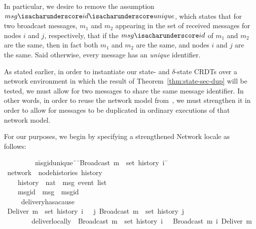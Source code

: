 In particular, we desire to remove the assumption
$msg{\isacharunderscore}id{\isacharunderscore}unique$, which states that for two
broadcast messages, $m_1$ and $m_2$ appearing in the set of received messages
for nodes $i$ and $j$, respectively, that if the $msg{\isacharunderscore}id$ of
$m_1$ and $m_2$ are the same, then in fact both $m_1$ and $m_2$ are the same,
and nodes $i$ and $j$ are the same. Said otherwise, every message has an
\emph{unique} identifier.

As stated earlier, in order to instantiate our state- and $\delta$-state CRDTs
over a network environment in which the result of
Theorem~\ref{thm:state-sec-dup} will be tested, we must allow for two messages
to share the same message identifier. In other words, in order to reuse the
network model from~\citep{gomes17}, we must strengthen it in order to allow for
messages to be duplicated in ordinary executions of that network model.

For our purposes, we begin by specifying a strengthened Network locale as
follows:
\begin{isabelle}
~~~~~~~~\ \=msg{\isacharunderscore}id{\isacharunderscore}unique{\isacharcolon}\ \={\isasymrbrakk}\ \={\isachardoublequoteopen}Broadcast\ m\ {\isasymin}\ set\ {\isacharparenleft}history\ i{\isacharparenright}\ \=\kill
{}\ network\ {\isacharequal}\ node{\isacharunderscore}histories\ history\\
~~~~\>history\ {\isacharcolon}{\isacharcolon}\ {\isachardoublequoteopen}nat\ {\isasymRightarrow}\ {\isacharprime}msg\ event\ list{\isachardoublequoteclose}\ {\isacharplus}\\
~~~~\>msg{\isacharunderscore}id\ {\isacharcolon}{\isacharcolon}\ {\isachardoublequoteopen}{\isacharprime}msg\ {\isasymRightarrow}\ {\isacharprime}msgid{\isachardoublequoteclose}\\
~~~~\ delivery{\isacharunderscore}has{\isacharunderscore}a{\isacharunderscore}cause{\isacharcolon}\\
\>\>{\isasymlbrakk}\ {\isachardoublequoteopen}Deliver\ m\ {\isasymin}\ set\ {\isacharparenleft}history\ i{\isacharparenright}\ \>\>{\isasymrbrakk}\ {\isasymLongrightarrow}\ {\isasymexists}j{\isachardot}\ Broadcast\ m\ {\isasymin}\ set\ {\isacharparenleft}history\ j{\isacharparenright}{\isachardoublequoteclose}\\
~~~~~~~~\>deliver{\isacharunderscore}locally{\isacharcolon}\ \>{\isasymlbrakk}\ \>{\isachardoublequoteopen}Broadcast\ m\ {\isasymin}\ set\ {\isacharparenleft}history\ i{\isacharparenright}\ \>{\isasymrbrakk}\ {\isasymLongrightarrow}\  Broadcast\ m\ {\isasymsqsubset}\isactrlsup i\ Deliver\ m{\isachardoublequoteclose}\\
\end{isabelle}

